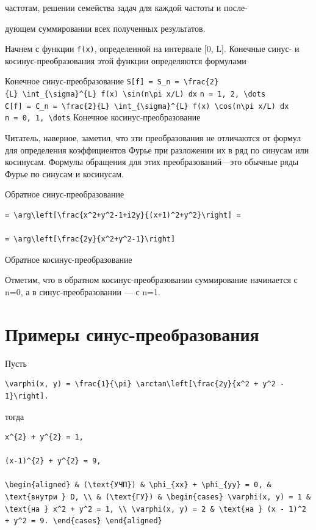 \documentclass[
  ukrainian,
]{article}
\begin{document}
частотам, решении семейства задач для каждой частоты и после-

дующем суммировании всех полученных результатов.

Начнем с функции \texttt{f(x)}, определенной на интервале {[}0, L{]}.
Конечные синус- и косинус-преобразования этой функции определяются
формулами

Конечное синус-преобразование
\texttt{S{[}f{]}\ =\ S\_n\ =\ \textbackslash{}frac\{2\}\{L\}\ \textbackslash{}int\_\{\textbackslash{}sigma\}\^{}\{L\}\ f(x)\ \textbackslash{}sin(n\textbackslash{}pi\ x/L)\ dx}
\texttt{n\ =\ 1,\ 2,\ \textbackslash{}dots}
\texttt{C{[}f{]}\ =\ C\_n\ =\ \textbackslash{}frac\{2\}\{L\}\ \textbackslash{}int\_\{\textbackslash{}sigma\}\^{}\{L\}\ f(x)\ \textbackslash{}cos(n\textbackslash{}pi\ x/L)\ dx}
\texttt{n\ =\ 0,\ 1,\ \textbackslash{}dots} Конечное
косинус-преобразование

Читатель, наверное, заметил, что эти преобразования не отличаются от
формул для определения коэффициентов Фурье при разложении их в ряд по
синусам или косинусам. Формулы обращения для этих преобразований---это
обычные ряды Фурье по синусам и косинусам.

Обратное синус-преобразование

\begin{verbatim}
= \arg\left[\frac{x^2+y^2-1+i2y}{(x+1)^2+y^2}\right] =

= \arg\left[\frac{2y}{x^2+y^2-1}\right]
\end{verbatim}

Обратное косинус-преобразование

Отметим, что в обратном косинус-преобразовании суммирование начинается с
n=0, а в синус-преобразовании --- с n=1.

\section{Примеры
синус-преобразования}\label{ux43fux440ux438ux43cux435ux440ux44b-ux441ux438ux43dux443ux441-ux43fux440ux435ux43eux431ux440ux430ux437ux43eux432ux430ux43dux438ux44f}

Пусть

\begin{verbatim}
\varphi(x, y) = \frac{1}{\pi} \arctan\left[\frac{2y}{x^2 + y^2 - 1}\right].
\end{verbatim}

тогда

\begin{verbatim}
x^{2} + y^{2} = 1,

(x-1)^{2} + y^{2} = 9,

\begin{aligned} & (\text{УЧП}) & \phi_{xx} + \phi_{yy} = 0, & \text{внутри } D, \\ & (\text{ГУ}) & \begin{cases} \varphi(x, y) = 1 & \text{на } x^2 + y^2 = 1, \\ \varphi(x, y) = 2 & \text{на } (x - 1)^2 + y^2 = 9. \end{cases} \end{aligned}
\end{verbatim}
\end{document}
